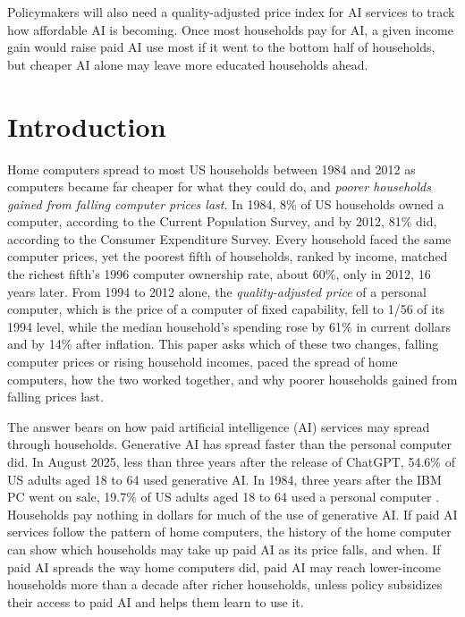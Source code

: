 \documentclass[11pt]{article}
\begin{document}
\noindent Policymakers will also need a quality-adjusted price index for AI services to track how affordable AI is becoming. Once most households pay for AI, a given income gain would raise paid AI use most if it went to the bottom half of households, but cheaper AI alone may leave more educated households ahead.

\clearpage

\section{Introduction}

Home computers spread to most US households between 1984 and 2012 as computers became far cheaper for what they could do, and \emph{poorer households gained from falling computer prices last}. In 1984, 8\% of US households owned a computer, according to the Current Population Survey, and by 2012, 81\% did, according to the Consumer Expenditure Survey. Every household faced the same computer prices, yet the poorest fifth of households, ranked by income, matched the richest fifth's 1996 computer ownership rate, about 60\%, only in 2012, 16 years later. From 1994 to 2012 alone, the \emph{quality-adjusted price} of a personal computer, which is the price of a computer of fixed capability, fell to 1/56 of its 1994 level, while the median household's spending rose by 61\% in current dollars and by 14\% after inflation. This paper asks which of these two changes, falling computer prices or rising household incomes, paced the spread of home computers, how the two worked together, and why poorer households gained from falling prices last.

The answer bears on how paid artificial intelligence (AI) services may spread through households. Generative AI has spread faster than the personal computer did. In August 2025, less than three years after the release of ChatGPT, 54.6\% of US adults aged 18 to 64 used generative AI. In 1984, three years after the IBM PC went on sale, 19.7\% of US adults aged 18 to 64 used a personal computer \citep{bick2025state}. Households pay nothing in dollars for much of the use of generative AI. If paid AI services follow the pattern of home computers, the history of the home computer can show which households may take up paid AI as its price falls, and when. If paid AI spreads the way home computers did, paid AI may reach lower-income households more than a decade after richer households, unless policy subsidizes their access to paid AI and helps them learn to use it.
\end{document}
